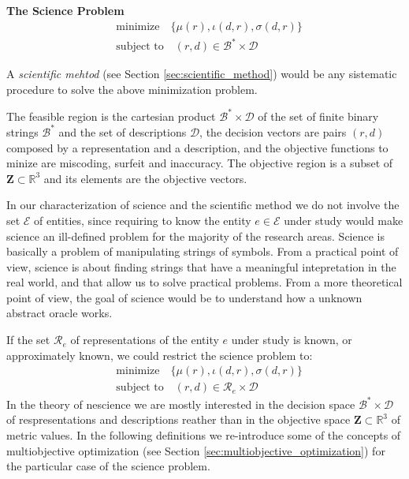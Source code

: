 \begin{tBox}
\textbf{The Science Problem}
\begin{align*}
 & \text{minimize} \quad \{ \mu(r), \iota(d, r), \sigma(d, r)\} \\
 & \text{subject to} \quad (r, d) \in \mathcal{B}^\ast \times \mathcal{D}
\end{align*}
\end{tBox}

A \emph{scientific mehtod} (see Section \ref{sec:scientific_method}) would be any sistematic procedure to solve the above minimization problem.

The feasible region is the cartesian product $\mathcal{B}^\ast \times \mathcal{D}$ of the set of finite binary strings $\mathcal{B}^\ast$ and the set of descriptions $\mathcal{D}$, the decision vectors are pairs $(r, d)$ composed by a representation and a description, and the objective functions to minize are miscoding, surfeit and inaccuracy. The objective region is a subset of $\mathbf{Z} \subset \mathbb{R}^3$ and its elements are the objective vectors.

In our characterization of science and the scientific method we do not involve the set $\mathcal{E}$ of entities, since requiring to know the entity $e \in \mathcal{E}$ under study would make science an ill-defined problem for the majority of the research areas. Science is basically a problem of manipulating strings of symbols. From a practical point of view, science is about finding strings that have a meaningful intepretation in the real world, and that allow us to solve practical problems. From a more theoretical point of view, the goal of science would be to understand how a unknown abstract oracle works.

If the set $\mathcal{R}_e$ of representations of the entity $e$ under study is known, or approximately known, we could restrict the science problem to:
\begin{align*}
 & \text{minimize} \quad \{ \mu(r), \iota(d, r), \sigma(d, r)\} \\
 & \text{subject to} \quad (r, d) \in \mathcal{R}_e \times \mathcal{D}
\end{align*}
In the theory of nescience we are mostly interested in the decision space $\mathcal{B}^\ast \times \mathcal{D}$ of respresentations and descriptions reather than in the objective space $\mathbf{Z} \subset \mathbb{R}^3$ of metric values. In the following definitions we re-introduce some of the concepts of multiobjective optimization (see Section \ref{sec:multiobjective_optimization}) for the particular case of the science problem.

